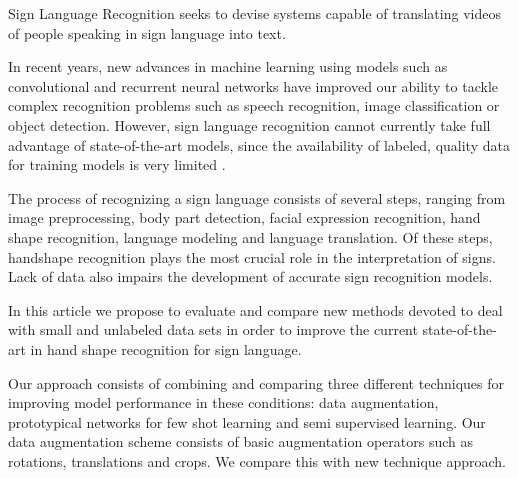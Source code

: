 Sign Language Recognition  seeks to devise systems capable of  translating videos of people speaking in sign language into text.

In recent years, new advances in machine learning using models such as convolutional and recurrent neural networks have improved our ability to tackle complex recognition problems such as speech recognition,  image classification  or object detection. However, sign language recognition cannot currently take full advantage  of state-of-the-art models, since  the availability of labeled, quality data for training models is very limited \cite{}.   

The process of recognizing a sign language consists of several steps, ranging from image preprocessing, body part detection, facial expression recognition, hand shape recognition,  language modeling and language translation. Of these steps, handshape recognition plays  the most crucial role in the interpretation of signs\cite{}.  Lack of data also impairs the development of accurate sign recognition models.

In this article we propose to evaluate and compare new methods devoted to deal with small and unlabeled data sets in order to improve the current state-of-the-art in hand shape recognition for sign language. 

Our approach consists of combining and comparing three different techniques for improving model performance in these conditions: data augmentation,  prototypical networks for few shot learning and semi supervised learning. Our data augmentation scheme consists of basic augmentation operators such as rotations, translations  and crops.  We compare this  with new technique approach.

    